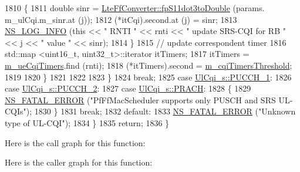 \begin{DoxyCode}
1810               \{
1811                 \textcolor{keywordtype}{double} sinr = \hyperlink{classns3_1_1LteFfConverter_aa5d8c2a8f988dbd63da91818c18666eb}{LteFfConverter::fpS11dot3toDouble} (params.
      m\_ulCqi.m\_sinr.at (j));
1812                 (*itCqi).second.at (j) = sinr;
1813                 \hyperlink{group__logging_gafbd73ee2cf9f26b319f49086d8e860fb}{NS\_LOG\_INFO} (\textcolor{keyword}{this} << \textcolor{stringliteral}{" RNTI "} << rnti << \textcolor{stringliteral}{" update SRS-CQI for RB  "} << j << \textcolor{stringliteral}{"
       value "} << sinr);
1814               \}
1815             \textcolor{comment}{// update correspondent timer}
1816             std::map <uint16\_t, uint32\_t>::iterator itTimers;
1817             itTimers = \hyperlink{classns3_1_1RrFfMacScheduler_a348744ac7d5fc0c7d00d6df7efff37a4}{m\_ueCqiTimers}.find (rnti);
1818             (*itTimers).second = \hyperlink{classns3_1_1RrFfMacScheduler_a51ae1963d7d95e89917af4c603f08a91}{m\_cqiTimersThreshold};
1819 
1820           \}
1821 
1822 
1823       \}
1824       \textcolor{keywordflow}{break};
1825     \textcolor{keywordflow}{case} \hyperlink{structns3_1_1UlCqi__s_aece9e5ebea42eb9ff1744c72c8459b57a05ca6554bc6fcd96a0a51fbaa8e794c7}{UlCqi\_s::PUCCH\_1}:
1826     \textcolor{keywordflow}{case} \hyperlink{structns3_1_1UlCqi__s_aece9e5ebea42eb9ff1744c72c8459b57a35664b4bda6f1cd6acfe9edc84c7571d}{UlCqi\_s::PUCCH\_2}:
1827     \textcolor{keywordflow}{case} \hyperlink{structns3_1_1UlCqi__s_aece9e5ebea42eb9ff1744c72c8459b57af93f36792cb1eed08f6119e4abfe58e8}{UlCqi\_s::PRACH}:
1828       \{
1829         \hyperlink{group__fatal_ga5131d5e3f75d7d4cbfd706ac456fdc85}{NS\_FATAL\_ERROR} (\textcolor{stringliteral}{"PfFfMacScheduler supports only PUSCH and SRS UL-CQIs"});
1830       \}
1831       \textcolor{keywordflow}{break};
1832     \textcolor{keywordflow}{default}:
1833       \hyperlink{group__fatal_ga5131d5e3f75d7d4cbfd706ac456fdc85}{NS\_FATAL\_ERROR} (\textcolor{stringliteral}{"Unknown type of UL-CQI"});
1834     \}
1835   \textcolor{keywordflow}{return};
1836 \}
\end{DoxyCode}


Here is the call graph for this function\+:




Here is the caller graph for this function\+:


